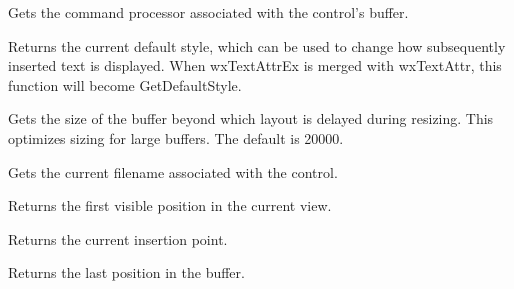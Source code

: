 \label{wxrichtextctrlgetcommandprocessor}


Gets the command processor associated with the control's buffer.

\label{wxrichtextctrlgetdefaultstyleex}


Returns the current default style, which can be used to change how subsequently inserted
text is displayed. When wxTextAttrEx is merged with wxTextAttr, this function
will become GetDefaultStyle.

\label{wxrichtextctrlgetdelayedlayoutthreshold}


Gets the size of the buffer beyond which layout is delayed during resizing.
This optimizes sizing for large buffers. The default is 20000.

\label{wxrichtextctrlgetfilename}


Gets the current filename associated with the control.

\label{wxrichtextctrlgetfirstvisibleposition}


Returns the first visible position in the current view.

\label{wxrichtextctrlgetinsertionpoint}


Returns the current insertion point.

\label{wxrichtextctrlgetlastposition}


Returns the last position in the buffer.

\label{wxrichtextctrlgetlinelength}


